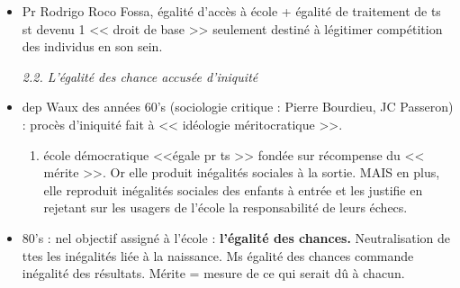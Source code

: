 \documentclass[12pt]{report}
\begin{document}
\begin{itemize}
\item Pr Rodrigo Roco Fossa, égalité d'accès à école + égalité de traitement de ts st devenu 1 << droit de base >> seulement destiné à légitimer compétition des individus en son sein.\\


\vspace{0.5cm}

\textit{2.2. L'égalité des chance accusée d'iniquité} \\

\item dep Waux des années 60's (sociologie critique : Pierre Bourdieu, JC Passeron) : procès d'iniquité fait à << idéologie méritocratique >>.
\begin{enumerate}
\item école démocratique <<égale pr ts >> fondée sur récompense du << mérite >>.  Or elle produit inégalités sociales à la sortie. MAIS en plus, elle reproduit inégalités sociales des enfants à entrée et les justifie en rejetant sur les usagers de l'école la responsabilité de leurs échecs.\\
\end{enumerate}

\item 80's : nel objectif assigné à l'école : \textbf{l'égalité des chances.} Neutralisation de ttes les inégalités liée à la naissance. Ms égalité des chances commande inégalité des résultats. Mérite = mesure de ce qui serait dû à chacun.\\


\end{itemize}
\end{document}
